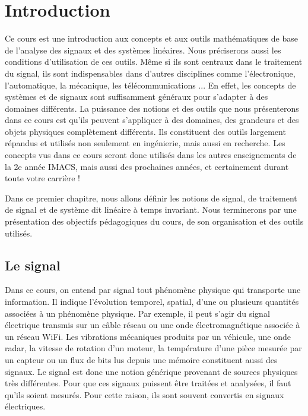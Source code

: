 \chapter{Introduction}
	
	Ce cours est une introduction aux concepts et aux outils mathématiques de base de l'analyse des signaux et des systèmes linéaires. Nous préciserons aussi les conditions d'utilisation de ces outils. Même si ils sont centraux dans le traitement du signal, ils sont indispensables dans d'autres disciplines comme l'électronique, l'automatique, la mécanique, les télécommunications ... En effet, les concepts de systèmes et de signaux sont suffisamment généraux pour s'adapter à des domaines différents. La puissance des notions et des outils que nous présenterons dans ce cours est qu'ils peuvent s'appliquer à des domaines, des grandeurs et des objets physiques complètement différents. Ils constituent des outils largement répandus et utilisés non seulement en ingénierie, mais aussi en recherche.	Les concepts vus dans ce cours seront donc utilisés dans les autres enseignements de la 2e année IMACS, mais aussi des prochaines années, et certainement durant toute votre carrière !
	
	Dans ce premier chapitre, nous allons définir les notions de signal, de traitement de signal et de système dit linéaire à temps invariant. Nous terminerons par une présentation des objectifs pédagogiques du cours, de son organisation et des outils utilisés.
	
	

	
	\section{Le signal}
	
	Dans ce cours, on entend par signal tout phénomène physique qui transporte une information. Il indique l'évolution temporel, spatial, d'une ou plusieurs quantités associées à un phénomène physique. Par exemple, il peut s'agir du signal électrique transmis sur un câble réseau ou une onde électromagnétique associée à un réseau WiFi. Les vibrations mécaniques produits par un véhicule, une onde radar, la vitesse de rotation d'un moteur, la température d'une pièce mesurée par un capteur ou un flux de bits lus depuis une mémoire constituent aussi des signaux. Le signal est donc une notion générique provenant de sources physiques très différentes. Pour que ces signaux puissent être traitées et analysées, il faut qu'ils soient mesurés. Pour cette raison, ils sont souvent convertis en signaux électriques.
	
